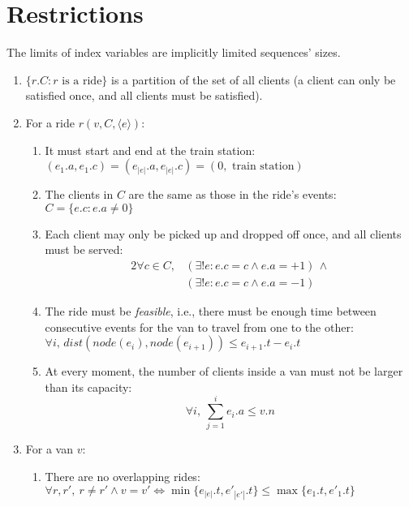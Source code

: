 \section{Restrictions} \label{problem-formalization-restrictions}
The limits of index variables are implicitly limited sequences' sizes.
\begin{enumerate}
    \item $\{r.C : r \text{ is a ride}\}$ is a partition of the set of all clients (a client can only be satisfied once, and all clients must be satisfied).
    \item For a ride $r(v,C,\langle e \rangle)$:
    \begin{enumerate}
        \item It must start and end at the train station: $(e_1.a, e_1.c) = (e_{|e|}.a,e_{|e|}.c)=(0, \text{ train station})$
        \item The clients in $C$ are the same as those in the ride's events: $C=\{e.c : e.a \neq 0\}$
        \item Each client may only be picked up and dropped off once, and all clients must be served:
        \begin{alignat*}{2}
            \forall c \in C,
            &(\exists !e: e.c = c \wedge e.a = +1)\,\wedge \\
            &(\exists !e: e.c = c \wedge e.a = -1)
        \end{alignat*}
        \item The ride must be \emph{feasible}, i.e., there must be enough time between consecutive events for the van to travel from one to the other: $\forall i,\,dist(node(e_i), node(e_{i+1})) \leq e_{i+1}.t - e_i.t$
        \item At every moment, the number of clients inside a van must not be larger than its capacity:
        \begin{equation*}
            \forall i,~\sum_{j=1}^{i}{e_i.a} \leq v.n
        \end{equation*}
    \end{enumerate}
    \item For a van $v$:
    \begin{enumerate}
        \item There are no overlapping rides: $\forall r, r',~r \neq r' \wedge v = v' \iff \min\{e_{|e|}.t,e'_{|e'|}.t\} \leq \max\{e_1.t,e'_1.t\}$
    \end{enumerate}
\end{enumerate}
